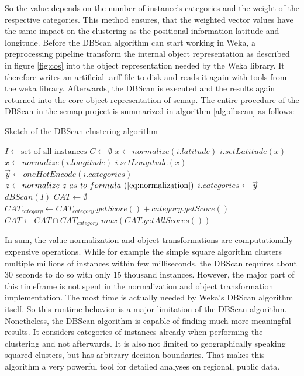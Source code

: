 So the value depends on the number of instance’s categories and the weight of the respective categories. This method ensures, that the weighted vector values have the same impact on the clustering as the positional information latitude and longitude. Before the DBScan algorithm can start working in Weka, a preprocessing pipeline transform the internal object representation as described in figure \ref{fig:cos} into the object representation needed by the Weka library. It therefore writes an artificial .arff-file to disk and reads it again with tools from the weka library. Afterwards, the DBScan is executed and the results again returned into the core object representation of semap. The entire procedure of the DBScan in the semap project is summarized in algorithm \ref{alg:dbscan} as follows:

\begin{algorithm}
\caption{Sketch of the DBScan clustering algorithm}\label{alg:dbscan}
\begin{algorithmic} 
\STATE $I \gets \text{set~of~all~instances}$
\STATE $C \gets \emptyset$
\STATE $x \gets normalize(i.latitude)$
\STATE $i.setLatitude(x)$
\STATE $x \gets normalize(i.longitude)$
\STATE $i.setLongitude(x)$
\STATE $\vec{y} \gets oneHotEncode(i.categories)$
\STATE $z \gets normalize~z~as~to~formula~(\ref{eq:normalization})$
\ENDFOR
\STATE $i.categories \gets \vec{y}$
\ENDFOR
\STATE $dBScan(I)$
\STATE ${CAT} \gets \emptyset$
\STATE ${CAT}_{category} \gets {CAT}_{category}.getScore() + category.getScore()$
\STATE ${CAT} \gets {CAT} \cap {CAT}_{category}$
\ENDFOR
\ENDFOR
\RETURN $max({CAT}.getAllScores())$
\end{algorithmic}
\end{algorithm}

In sum, the value normalization and object transformations are computationally expensive operations. While for example the simple square algorithm clusters multiple millions of instances within few milliseconds, the DBScan requires about 30 seconds to do so with only 15 thousand instances. However, the major part of this timeframe is not spent in the normalization and object transformation implementation. The most time is actually needed by Weka’s DBScan algorithm itself. So this runtime behavior is a major limitation of the DBScan algorithm. Nonetheless, the DBScan algorithm is capable of finding much more meaningful results. It considers categories of instances already when performing the clustering and not afterwards. It is also not limited to geographically speaking squared clusters, but has arbitrary decision boundaries. That makes this algorithm a very powerful tool for detailed analyses on regional, public data.

